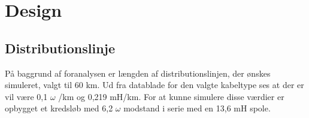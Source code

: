 
\chapter{Design}

\section{Distributionslinje}
På baggrund af foranalysen er længden af distributionslinjen, der ønskes simuleret, valgt til 60 km. Ud fra datablade for den valgte kabeltype ses at der er vil være 0,1 $\omega$ /km og 0,219 mH/km. For at kunne simulere disse værdier er opbygget et kredsløb med 6,2 $\omega$ modstand i serie med en 13,6 mH spole. 



